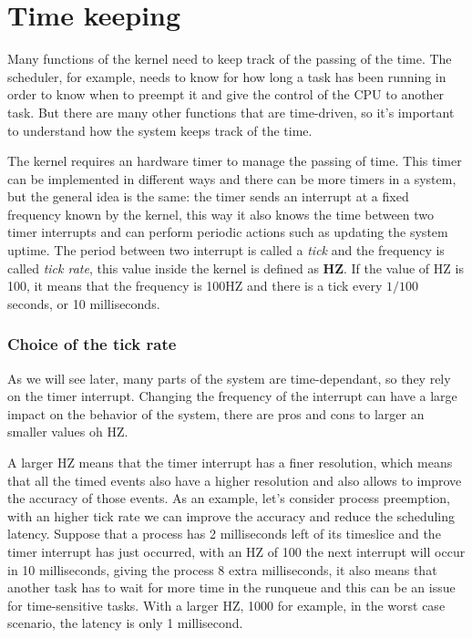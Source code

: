 \section{Time keeping}%
\label{sec:timekeeping}
Many functions of the kernel need to keep track of the passing of the time. The scheduler, for example, needs to know for how long a task has been running in order to know when to preempt it and give the control of the CPU to another task. But there are many other functions that are time-driven, so it's important to understand how the system keeps track of the time.

The kernel requires an hardware timer to manage the passing of time. This timer can be implemented in different ways and there can be more timers in a system, but the general idea is the same: the timer sends an interrupt at a fixed frequency known by the kernel, this way it also knows the time between two timer interrupts and can perform periodic actions such as updating the system uptime. The period between two interrupt is called a \textit{tick} and the frequency is called \textit{tick rate}, this value inside the kernel is defined as \textbf{HZ}. If the value of HZ is 100, it means that the frequency is 100HZ and there is a tick every $1/100$ seconds, or 10 milliseconds.

\subsubsection{Choice of the tick rate}
As we will see later, many parts of the system are time-dependant, so they rely on the timer interrupt. Changing the frequency of the interrupt can have a large impact on the behavior of the system, there are pros and cons to larger an smaller values oh HZ.

A larger HZ means that the timer interrupt has a finer resolution, which means that all the timed events also have a higher resolution and also allows to improve the accuracy of those events. As an example, let's consider process preemption, with an higher tick rate we can improve the accuracy and reduce the scheduling latency. Suppose that a process has 2 milliseconds left of its timeslice and the timer interrupt has just occurred, with an HZ of 100 the next interrupt will occur in 10 milliseconds, giving the process 8 extra milliseconds, it also means that another task has to wait for more time in the runqueue and this can be an issue for time-sensitive tasks. With a larger HZ, 1000 for example, in the worst case scenario, the latency is only 1 millisecond.

